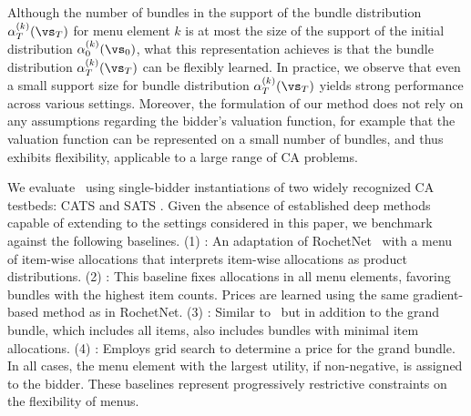 Although the number of bundles in the support of the bundle distribution $\alpha^{(k)}_T(\vs_T)$ for menu element $k$ is 
at most the size of the support of the initial distribution $\alpha^{(k)}_0(\vs_0)$, what this representation achieves
is that the bundle distribution $\alpha^{(k)}_T(\vs_T)$ can be flexibly learned.
In practice, we observe that even a small support size for bundle distribution $\alpha^{(k)}_T(\vs_T)$ yields strong performance across various settings. Moreover, the formulation of our method does not rely on any  assumptions regarding the bidder's valuation function, for example that the valuation function can be represented on a small number 
of bundles, and thus exhibits flexibility, applicable to a large range of CA problems.
%
%

We evaluate \name~using single-bidder instantiations of 
two widely recognized CA testbeds: CATS \citep{leyton2000towards} and SATS \citep{weiss2017sats}. Given the absence of established deep methods capable of extending to the settings considered in this paper, we benchmark against the following baselines. (1) \bundle: An adaptation of RochetNet~\cite{dutting2024optimal} with a menu of item-wise allocations  that interprets item-wise allocations as product distributions. (2) \bigbundle: This baseline fixes allocations in all menu elements, favoring bundles with the highest item counts. Prices are learned using the same gradient-based method as in RochetNet. (3) \smallbundle: Similar to \bigbundle\ but in addition to the grand bundle, which includes all items, also includes bundles with minimal item allocations. (4) \grandbundle: Employs grid search to determine a price for the grand bundle. In all cases, the menu element with the largest utility, if non-negative, is assigned to the bidder. 
These baselines represent progressively restrictive constraints on the flexibility of menus.


